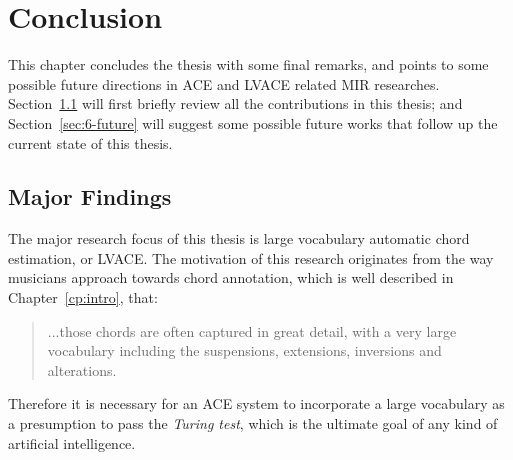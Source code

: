 

\chapter{Conclusion}\label{cp:conclude} %

%



\ifpdf
    \graphicspath{{8/figures/PNG/}{8/figures/PDF/}{8/figures/}}
\else
    \graphicspath{{8/figures/EPS/}{8/figures/}}
\fi


This chapter concludes the thesis with some final remarks, and points to some possible future directions in ACE and LVACE related MIR researches. Section~\ref{sec:6-recap} will first briefly review all the contributions in this thesis; and Section~\ref{sec:6-future} will suggest some possible future works that follow up the current state of this thesis.

\section{Major Findings} \label{sec:6-recap}
The major research focus of this thesis is large vocabulary automatic chord estimation, or LVACE. The motivation of this research originates from the way musicians approach towards chord annotation, which is well described in Chapter~\ref{cp:intro}, that:
\begin{quote}
...those chords are often captured in great detail, with a very large vocabulary including the suspensions, extensions, inversions and alterations.
\end{quote}
Therefore it is necessary for an ACE system to incorporate a large vocabulary as a presumption to pass the \textit{Turing test}, which is the ultimate goal of any kind of artificial intelligence.

